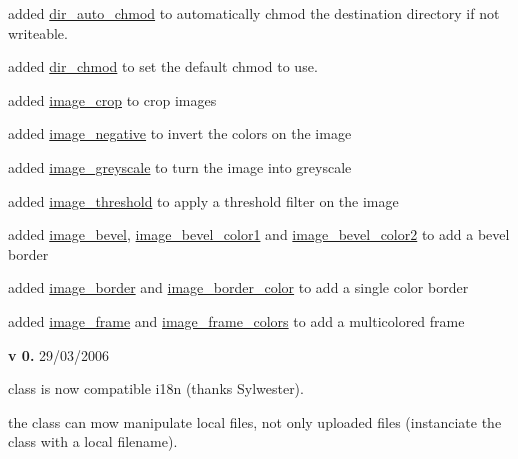 \begin{DoxyItemize}
\begin{DoxyItemize}
\item added \hyperlink{}{dir\+\_\+auto\+\_\+chmod} to automatically chmod the destination directory if not writeable.~\newline

\item added \hyperlink{}{dir\+\_\+chmod} to set the default chmod to use.~\newline

\item added \hyperlink{}{image\+\_\+crop} to crop images~\newline

\item added \hyperlink{}{image\+\_\+negative} to invert the colors on the image~\newline

\item added \hyperlink{}{image\+\_\+greyscale} to turn the image into greyscale~\newline

\item added \hyperlink{}{image\+\_\+threshold} to apply a threshold filter on the image~\newline

\item added \hyperlink{}{image\+\_\+bevel}, \hyperlink{}{image\+\_\+bevel\+\_\+color1} and \hyperlink{}{image\+\_\+bevel\+\_\+color2} to add a bevel border~\newline

\item added \hyperlink{}{image\+\_\+border} and \hyperlink{}{image\+\_\+border\+\_\+color} to add a single color border~\newline

\item added \hyperlink{}{image\+\_\+frame} and \hyperlink{}{image\+\_\+frame\+\_\+colors} to add a multicolored frame 
\end{DoxyItemize}
\item {\bfseries v 0.} 29/03/2006~\newline

\begin{DoxyItemize}
\item class is now compatible i18n (thanks Sylwester).~\newline

\item the class can mow manipulate local files, not only uploaded files (instanciate the class with a local filename).~\newline


\end{DoxyItemize}
\end{DoxyItemize}
